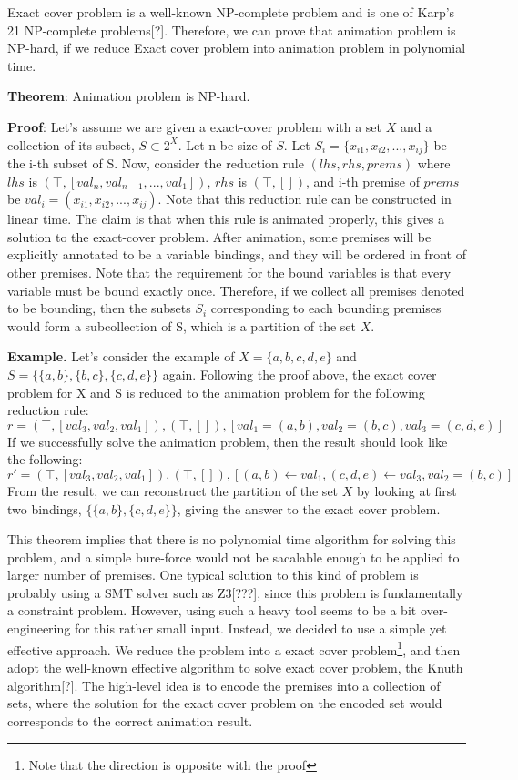 Exact cover problem is a well-known NP-complete problem and is one of Karp's 21 NP-complete problems[?].
Therefore, we can prove that animation problem is NP-hard, if we reduce Exact cover problem
into animation problem in polynomial time.

\textbf{Theorem}: Animation problem is NP-hard.

\textbf{Proof}: Let's assume we are given a exact-cover problem with a set $X$ and a
collection of its subset, $S \subset 2^X$. Let n be size of $S$.
Let $S_i = \{x_{i1}, x_{i2}, ..., x_{ij}\}$ be the i-th subset of S.
Now, consider the reduction rule $(lhs, rhs, prems)$ where
$lhs$ is $(\top, [val_n, val_{n-1}, ..., val_1])$,
$rhs$ is $(\top, [])$, and
i-th premise of $prems$ be $val_i = (x_{i1}, x_{i2}, ..., x_{ij})$.
Note that this reduction rule can be constructed in linear time.
The claim is that when this rule is animated properly, this gives a solution to the exact-cover problem.
After animation, some premises will be explicitly annotated to be a variable bindings,
and they will be ordered in front of other premises. Note that the requirement for the
bound variables is that every variable must be bound exactly once. Therefore, if we collect
all premises denoted to be bounding, then the subsets $S_i$ corresponding to each bounding premises
would form a subcollection of S, which is a partition of the set $X$.

\textbf{Example.}
Let's consider the example of $X = \{a, b, c, d, e\}$ and $S = \{\{a,b\}, \{b,c\}, \{c,d,e\}\}$ again.
Following the proof above, the exact cover problem for X and S is reduced to the animation problem for the
following reduction rule:
\[r = (\top, [val_3, val_2, val_1]), (\top, []), [val_1 = (a,b), val_2 = (b,c), val_3 = (c, d, e)]\]
If we successfully solve the animation problem, then the result should look like the following:
\[r' = (\top, [val_3, val_2, val_1]), (\top, []), [(a,b) \leftarrow val_1, (c, d, e) \leftarrow val_3, val_2 = (b,c)]\]
From the result, we can reconstruct the partition of the set $X$ by looking at first two bindings,
$\{\{a, b\}, \{c, d, e\}\}$, giving the answer to the exact cover problem.

This theorem implies that there is no polynomial time algorithm for solving this problem, and a
simple bure-force would not be sacalable enough to be applied to larger number of premises.
One typical solution to this kind of problem is probably using a SMT solver such as Z3[???], since
this problem is fundamentally a constraint problem.
However, using such a heavy tool seems to be a bit over-engineering for this rather small input.
Instead, we decided to use a simple yet effective approach.
We reduce the problem into a exact cover problem\footnote{Note that the direction is opposite with
the proof}, and then adopt the well-known effective algorithm to solve exact cover problem,
the Knuth algorithm[?]. The high-level idea is to encode the premises into a
collection of sets, where the solution for the exact cover problem on the encoded set
would corresponds to the correct animation result.

